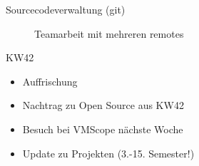 \documentclass[aspectratio=169,t]{beamer}
\begin{document}
\begin{frame}{Sourcecodeverwaltung (git)}
    \begin{minipage}{.4\textwidth}
        \begin{figure}[h!]
            \caption{Teamarbeit mit mehreren remotes \cite{gitbranching}}
        \end{figure}
    \end{minipage}
\end{frame}

\begin{frame}{KW42}
    \begin{itemize}
        \item Auffrischung
        \item<2-> Nachtrag zu Open Source aus KW42
	\item<3-> Besuch bei VMScope nächste Woche
        \item<4-> Update zu Projekten (3.-15. Semester!)
    \end{itemize}
\end{frame}
\end{document}
